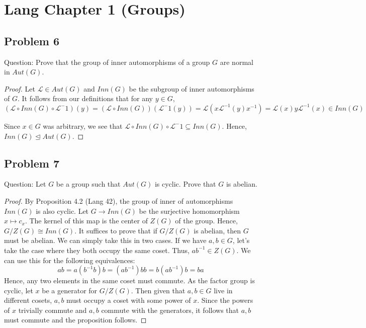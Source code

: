 \documentclass[Lang.tex]{subfiles}
\begin{document}
\section*{Lang Chapter 1 (Groups)}
\subsection*{Problem 6}

Question: Prove that the group of inner automorphisms of a group $G$ are normal in $Aut(G)$. \par
\begin{proof}
Let $\mathcal{L} \in Aut(G)$ and $Inn(G)$ be the subgroup of inner automorphisms of $G$. It follows from our definitions that for any $y \in G$,  $$(\mathcal{L} \circ Inn(G) \circ \mathcal{L}^-1)(y) = (\mathcal{L} \circ Inn(G)) (\mathcal{L}^-1(y)) = \mathcal{L}(x \mathcal{L}^{-1}(y) x^{-1}) = \mathcal{L}(x) y \mathcal{L}^{-1}(x) \in Inn(G)$$

Since $x \in G$ was arbitrary, we see that $\mathcal{L} \circ Inn(G) \circ \mathcal{L}^-1 \subseteq Inn(G)$. Hence, $Inn(G) \trianglelefteq Aut(G)$. \end{proof}

\subsection*{Problem 7}

Question: Let $G$ be a group such that $Aut(G)$ is cyclic. Prove that $G$ is abelian.

\begin{proof}
By Proposition 4.2 (Lang 42), the group of inner of automorphisms $Inn(G)$ is also cyclic. Let $G \rightarrow Inn(G)$ be the surjective homomorphism $x \mapsto c_x$. The kernel of this map is the center of $Z(G)$ of the group. Hence, $G/Z(G) \cong Inn(G)$. It suffices to prove that if $G/Z(G)$ is abelian, then $G$ must be abelian. We can simply take this in two cases. If we have $a,b \in G$, let's take the case where they both occupy the same coset. Thus, $ab^{-1} \in Z(G)$. We can use this for the following equivalences:
 $$ ab = a(b^{-1}b)b = (ab^{-1})bb = b(ab^{-1})b = ba$$
 Hence, any two elements in the same coset must commute. As the factor group is cyclic, let $x$ be a generator for $G/Z(G)$. Then given that $a,b \in G$ live in different cosets, $a,b$ must occupy a coset with some power of $x$. Since the powers of $x$ trivially commute and $a,b$ commute with the generators, it follows that $a,b$ must commute and the proposition follows.
\end{proof}
\end{document}
